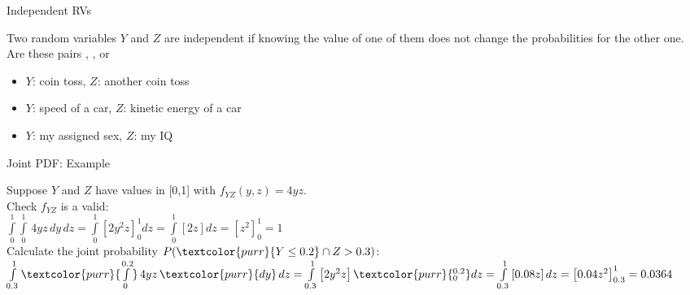 \documentclass[10pt,sans,english,compress,table,xcolor=dvipsnames]{beamer}
\begin{document}
\begin{frame}{Independent RVs}

Two random variables $Y$ and $Z$ are independent if knowing the value of one of them does not change the probabilities for the other one.\\[1ex]

Are these pairs , , or \\[1ex]

\begin{itemize}
\item $Y$: coin toss, $Z$: another coin toss\\[1ex]
\item $Y$: speed of a car, $Z$: kinetic energy of a car\\[1ex]
\item $Y$: my assigned sex, $Z$: my IQ\\
\end{itemize}


\vspace{2cm}

\end{frame}





\begin{frame}{Joint PDF: Example}

Suppose $Y$ and $Z$ have values in [0,1] with $f_{YZ}(y,z) = 4yz$.\\[1ex]

Check $f_{YZ}$ is a valid:\\[1ex]
$
\int \limits_{0}^{1}  \int \limits_{0}^{1}\,4yz\, dy\, dz = 
\int \limits_{0}^{1} \left[ 2y^2z\right]_{0}^{1} dz =
\int \limits_{0}^{1} \left[ 2z\right] dz =
 \left[ z^2\right]_{0}^{1}  = 1
$\\[2ex]

Calculate the joint probability $P(\textcolor{purr}{Y \leq 0.2} \cap Z > 0.3)$:\\[1ex]
$
\int \limits_{0.3}^{1}  \textcolor{purr}{\int \limits_{0}^{0.2}}\,4yz\, \textcolor{purr}{dy}\, dz = 
\int \limits_{0.3}^{1} \left[ 2y^2z\right]\textcolor{purr}{_{0}^{0.2}} dz =
\int \limits_{0.3}^{1} \left[ 0.08z\right] dz =
 \left[ 0.04z^2\right]_{0.3}^{1}  = 0.0364
$\\


\end{frame}
\end{document}
